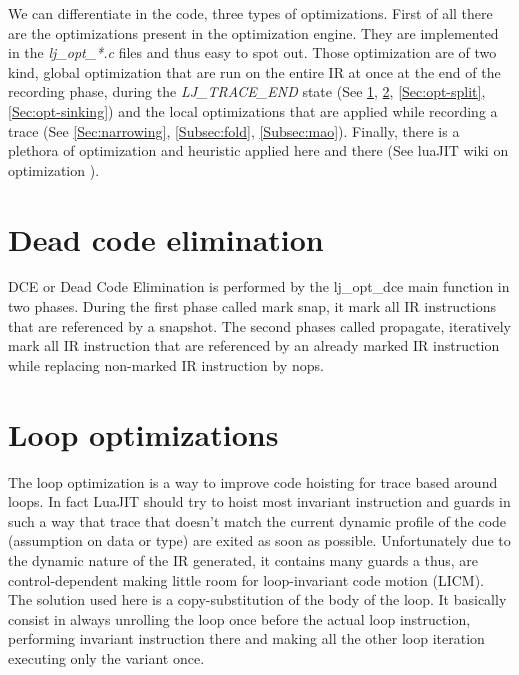 
We can differentiate in the code, three types of optimizations.
First of all there are the optimizations present in the optimization engine.
They are implemented in the \emph{lj\_opt\_*.c} files and thus easy to spot out.
Those optimization are of two kind, global optimization that are run on the
entire IR at once at the end of the recording phase, during the
\emph{LJ\_TRACE\_END} state (See \ref{Sec:opt-dce}, \ref{Sec:opt-loop},
\ref{Sec:opt-split}, \ref{Sec:opt-sinking}) and the local optimizations that are
applied while recording a trace (See \ref{Sec:narrowing}, \ref{Subsec:fold},
\ref{Subsec:mao}). Finally, there is a plethora of optimization and heuristic
applied here and there (See luaJIT wiki on optimization \cite{luajit-opt}).


\section{Dead code elimination}
\label{Sec:opt-dce}

DCE or Dead Code Elimination is performed by the lj\_opt\_dce main function
in two phases. During the first phase called mark snap, it mark all IR
instructions that are referenced by a snapshot. The second phases called
propagate, iteratively mark all IR instruction that are referenced by an already
marked IR instruction while replacing non-marked IR instruction by nops.


\section{Loop optimizations}
\label{Sec:opt-loop}

The loop optimization is a way to improve code hoisting for trace based around
loops. In fact LuaJIT should try to hoist most invariant instruction and guards
in such a way that trace that doesn't match the current dynamic profile of
the code (assumption on data or type) are exited as soon as possible.
Unfortunately due to the dynamic nature of the IR generated, it contains many
guards a thus, are control-dependent making little room for loop-invariant
code motion (LICM). The solution used here is a copy-substitution of the body
of the loop. It basically consist in always unrolling the loop once before the
actual loop instruction, performing invariant instruction there and making
all the other loop iteration executing only the variant once.

